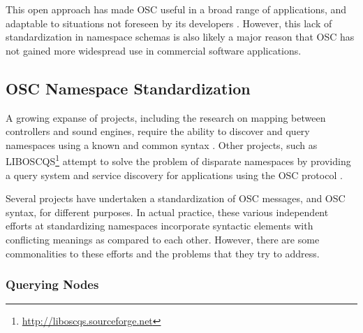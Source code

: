 \documentclass{NIME-alternate}
\begin{document}
This open approach has made OSC useful in a broad range of applications, and adaptable to situations not foreseen by its developers \cite{Wright:2005}.  However, this lack of standardization in namespace schemas is also likely a major reason that OSC has not gained more widespread use in commercial software applications.



\subsection{OSC Namespace Standardization} %
\label{sub:namespace_standardization}

A growing expanse of projects, including the research on mapping between controllers and sound engines, require the ability to discover and query namespaces using a known and common syntax \cite{Malloch:2007}. Other projects, such as LIBOSCQS\footnote{\url{http://liboscqs.sourceforge.net}} attempt to solve the problem of disparate namespaces by providing a query system and service discovery for applications using the OSC protocol \cite{Habets:2005, Schmeder:2004oscqs}.



Several projects have undertaken a standardization of OSC messages, and OSC syntax, for different purposes. In actual practice, these various independent efforts at standardizing namespaces incorporate syntactic elements with conflicting meanings as compared to each other. However, there are some commonalities to these efforts and the problems that they try to address.

\subsubsection{Querying Nodes}
\label{ssub:querying_nodes}
\end{document}
